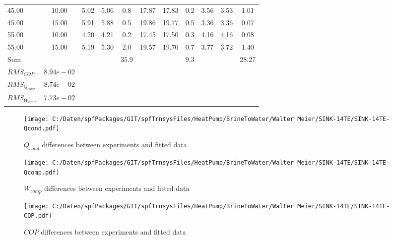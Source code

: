 \documentclass[english]{SPFShortReport}
\begin{document}
\begin{table}[!ht]
\begin{small}
\begin{center}
{\begin{tabular}{l | c c c c c c c c c c }
45.00  & 10.00 & 5.02 & 5.06 & 0.8 & 17.87 & 17.83 & 0.2 & 3.56 & 3.53 & 1.01\\ 
45.00  & 15.00 & 5.91 & 5.88 & 0.5 & 19.86 & 19.77 & 0.5 & 3.36 & 3.36 & 0.07\\ 
55.00  & 10.00 & 4.20 & 4.21 & 0.2 & 17.45 & 17.50 & 0.3 & 4.16 & 4.16 & 0.08\\ 
55.00  & 15.00 & 5.19 & 5.30 & 2.0 & 19.57 & 19.70 & 0.7 & 3.77 & 3.72 & 1.40\\ 
\hline 
 Sum &  & &  & 35.9 &  &  & 9.3 & &  & 28.27\\ 
\hline 
 $RMS_{COP}$ & $8.94e-02$ \\ 
 $RMS_{Q_{cond}}$ & $8.74e-02$ \\ 
 $RMS_{W_{comp}}$ & $7.73e-02$ \\ 
\hline
\hline
\end{tabular}
}
\label{ErrorsTable}
\end{center}
\end{small}
\end{table}
\begin{figure}[!ht]
\begin{center}
\texttt{[image: C:/Daten/spfPackages/GIT/spfTrnsysFiles/HeatPump/BrineToWater/Walter Meier/SINK-14TE/SINK-14TE-Qcond.pdf]}
\caption{$Q_{cond}$ differences between experiments and fitted data}
\label{QcongFig}
\end{center}
\end{figure}
\begin{figure}[!ht]
\begin{center}
\texttt{[image: C:/Daten/spfPackages/GIT/spfTrnsysFiles/HeatPump/BrineToWater/Walter Meier/SINK-14TE/SINK-14TE-Qcomp.pdf]}
\caption{$W_{comp}$ differences between experiments and fitted data}
\label{QcompFig}
\end{center}
\end{figure}
\begin{figure}[!ht]
\begin{center}
\texttt{[image: C:/Daten/spfPackages/GIT/spfTrnsysFiles/HeatPump/BrineToWater/Walter Meier/SINK-14TE/SINK-14TE-COP.pdf]}
\caption{$COP$ differences between experiments and fitted data}
\label{COPFig}
\end{center}
\end{figure}
\end{document}
